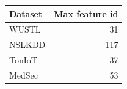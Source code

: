 \begin{tabular}{lr}
\toprule
Dataset & Max feature id \\
\midrule
WUSTL & 31 \\
NSLKDD & 117 \\
TonIoT & 37 \\
MedSec & 53 \\
\bottomrule
\end{tabular}
